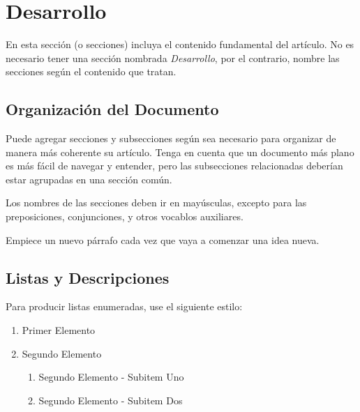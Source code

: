 \documentclass[a4paper,10pt]{article}
\begin{document}



\section{Desarrollo}\label{sec:dev}
  En esta sección (o secciones) incluya el contenido fundamental del artículo.
  No es necesario tener una sección nombrada \emph{Desarrollo}, por el contrario,
  nombre las secciones según el contenido que tratan.

	\subsection{Organización del Documento}\label{sub:results}
		Puede agregar secciones y subsecciones según sea necesario para organizar
		de manera más coherente su artículo. Tenga en cuenta que un documento más
		plano es más fácil de navegar y entender, pero las subsecciones relacionadas
		deberían estar agrupadas en una sección común.

		Los nombres de las secciones deben ir en mayúsculas, excepto para las
		preposiciones, conjunciones, y otros vocablos auxiliares.

		Empiece un nuevo párrafo cada vez que vaya a comenzar una idea nueva.

	\subsection{Listas y Descripciones}\label{sub:lists}
		Para producir listas enumeradas, use el siguiente estilo:

		\begin{enumerate}
			\item Primer Elemento
			\item Segundo Elemento
			\begin {enumerate}
				\item {Segundo Elemento - Subitem Uno}
				\item {Segundo Elemento - Subitem Dos}
			\end {enumerate}
		\end{enumerate}
\end{document}
